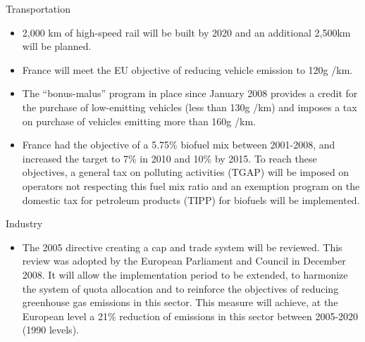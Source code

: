 Transportation
\begin{itemize}
	\item 2,000 km of high-speed rail will be built by 2020 and an additional 2,500km will be planned. 
	\item France will meet the EU objective of reducing vehicle emission to 120g /km.
	\item The “bonus-malus” program in place since January 2008 provides a credit for the purchase of low-emitting vehicles  (less than 130g /km) and imposes a tax on purchase of vehicles emitting more than 160g /km.
	\item France had the objective of a 5.75\% biofuel mix between 2001-2008, and increased the target to 7\% in 2010 and 10\% by 2015. To reach these objectives, a general tax on polluting activities (TGAP) will be imposed on operators not respecting this fuel mix ratio and an exemption program on the domestic tax for petroleum products (TIPP) for biofuels will be implemented.
\end{itemize}



Industry
\begin{itemize}
	\item The 2005 directive creating a cap and trade system will be reviewed. This review was adopted by the European Parliament and Council in December 2008. It will allow the implementation period to be extended, to harmonize the system of quota allocation and to reinforce the objectives of reducing greenhouse gas emissions in this sector. This measure will achieve, at the European level a 21\% reduction of emissions in this sector between 2005-2020 (1990 levels).
\end{itemize}



